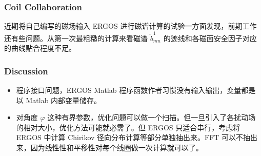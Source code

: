 \begin{frame}
  \frametitle{Coil Collaboration}
  近期将自己编写的磁场输入 ERGOS 进行磁谱计算的试验一方面发现，前期工作还有些问题。从第一次最粗糙的计算来看磁谱 $\tilde{b}^1_{mn}$ 的迹线和各磁面安全因子对应的曲线贴合程度不足。
  

  \begin{figure}[t]
    \centering
    \hfill
  \end{figure}
  
\end{frame}




\begin{frame}
  \frametitle{Discussion}

  \begin{itemize}
    \item 程序接口问题，ERGOS Matlab 程序函数作者习惯没有输入输出，变量都是以 Matlab 内部变量储存。
    \item 对角度 $\varphi$ 这种有界参数，优化问题可以做一个扫描。但一旦引入了各扰动场的相对大小，优化方法可能就必需了。但 ERGOS 只适合串行，考虑将 ERGOS 中计算 Chirikov 径向分布计算等部分单独抽出来。FFT 可以不抽出来，因为线性性和平移性对每个线圈做一次计算就可以了。
  \end{itemize}
  
\end{frame}